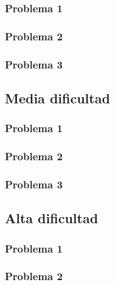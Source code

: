 \documentclass[
  spanish,
]{article}
\begin{document}
\hypertarget{problema-1}{%
\subsubsection{Problema 1}\label{problema-1}}

\hypertarget{problema-2}{%
\subsubsection{Problema 2}\label{problema-2}}

\hypertarget{problema-3}{%
\subsubsection{Problema 3}\label{problema-3}}

\hypertarget{media-dificultad}{%
\subsection{Media dificultad}\label{media-dificultad}}

\hypertarget{problema-1-1}{%
\subsubsection{Problema 1}\label{problema-1-1}}

\hypertarget{problema-2-1}{%
\subsubsection{Problema 2}\label{problema-2-1}}

\hypertarget{problema-3-1}{%
\subsubsection{Problema 3}\label{problema-3-1}}

\hypertarget{alta-dificultad}{%
\subsection{Alta dificultad}\label{alta-dificultad}}

\hypertarget{problema-1-2}{%
\subsubsection{Problema 1}\label{problema-1-2}}

\hypertarget{problema-2-2}{%
\subsubsection{Problema 2}\label{problema-2-2}}
\end{document}
